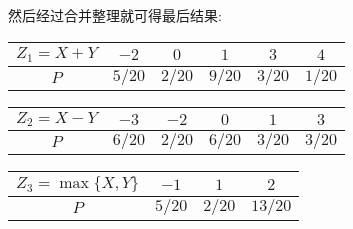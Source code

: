 \begin{example}
\begin{solution}
   		然后经过合并整理就可得最后结果:
   		\begin{center}
   			\begin{tabular}{c|ccccc}
   				\hline
   				$Z_1=X+Y$ & $-2$ & $0$ & $1$ & $3$ & $4$\\
   				\hline
   				$P$ & $5/20$ & $2/20$ & $9/20$ & $3/20$ & $1/20$\\
   				\hline
   			\end{tabular}
   		\end{center}
   	    \begin{center}
   	    	\begin{tabular}{c|ccccc}
   	    		\hline
   	    		$Z_2=X-Y$ & $-3$ & $-2$ & $0$ & $1$ & $3$\\
   	    		\hline
   	    		$P$ & $6/20$ & $2/20$ & $6/20$ & $3/20$ & $3/20$\\
   	    		\hline
   	    	\end{tabular}
   	    \end{center}
       \begin{center}
       	\begin{tabular}{c|ccc}
       		\hline
       		$Z_3=\max\{X,Y\}$ & $-1$ & $1$ & $2$\\
       		\hline
       		$P$ & $5/20$ &  $2/20$ & $13/20$\\
       		\hline
       	\end{tabular}
       \end{center}
   	\end{solution}
   \end{example}
   
